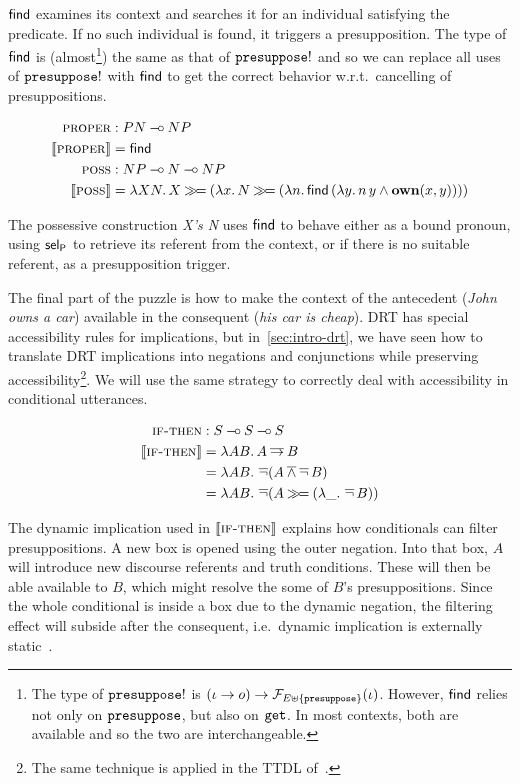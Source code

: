 $\textsf{find}$ examines its context and searches it for an individual satisfying
the predicate. If no such individual is found, it triggers a
presupposition. The type of $\textsf{find}$ is (almost\footnote{The type of
  $\mathtt{presuppose}!$ is
  $(\iota \to o) \to \mathcal{F}_{E \uplus \{\mathtt{presuppose}\}}(\iota)$. However,
  $\textsf{find}$ relies not only on $\mathtt{presuppose}$, but also on $\mathtt{get}$. In
  most contexts, both are available and so the two are interchangeable.})
the same as that of $\mathtt{presuppose}!$ and so we can replace all uses of
$\mathtt{presuppose}!$ with $\textsf{find}$ to get the correct behavior w.r.t.\
cancelling of presuppositions.

\begin{align*}
  \textsc{proper} &: PN \mathbin{{-}\mkern-3.5mu{\circ}} NP \\
  \llbracket \textsc{proper} \rrbracket &= \textsf{find} \\
  \textsc{poss} &: NP \mathbin{{-}\mkern-3.5mu{\circ}} N \mathbin{{-}\mkern-3.5mu{\circ}} NP \\
  \llbracket \textsc{poss} \rrbracket &= \lambda X N.\, X \mathbin{\gg\!=} (\lambda x.\, N \mathbin{\gg\!=} (\lambda n.\, \textsf{find}\,(\lambda y.\, n\,y \land \textbf{own}(x, y))))
\end{align*}

The possessive construction \emph{X's N} uses $\textsf{find}$ to behave either as a
bound pronoun, using $\textsf{sel}_{\textsf{P}}$ to retrieve its referent from the context, or
if there is no suitable referent, as a presupposition trigger.

The final part of the puzzle is how to make the context of the antecedent
(\emph{John owns a car}) available in the consequent (\emph{his car is
  cheap}). DRT has special accessibility rules for implications, but
in~\ref{sec:intro-drt}, we have seen how to translate DRT implications into
negations and conjunctions while preserving accessibility\footnote{The same
  technique is applied in the TTDL of~\cite{lebedeva2012expression}.}. We
will use the same strategy to correctly deal with accessibility in
conditional utterances.

\begin{align*}
  \textsc{if-then} &: S \mathbin{{-}\mkern-3.5mu{\circ}} S \mathbin{{-}\mkern-3.5mu{\circ}} S \\
  \llbracket \textsc{if-then} \rrbracket &= \lambda A B.\, A \mathbin{\overline{\to}} B \\
  &= \lambda A B.\, \mathop{\overline{\lnot}} (A \mathbin{\overline{\land}} \mathop{\overline{\lnot}} B) \\
  &= \lambda A B.\, \mathop{\overline{\lnot}} (A \mathbin{\gg\!=} (\lambda \_.\, \mathop{\overline{\lnot}} B))
\end{align*}

The dynamic implication used in $\llbracket \textsc{if-then} \rrbracket$ explains how
conditionals can filter presuppositions. A new box is opened using the
outer negation. Into that box, $A$ will introduce new discourse referents
and truth conditions. These will then be able available to $B$, which might
resolve the some of $B$'s presuppositions. Since the whole conditional is
inside a box due to the dynamic negation, the filtering effect will subside
after the consequent, i.e.\ dynamic implication is externally
static~\cite{groenendijk1991dynamic}.

